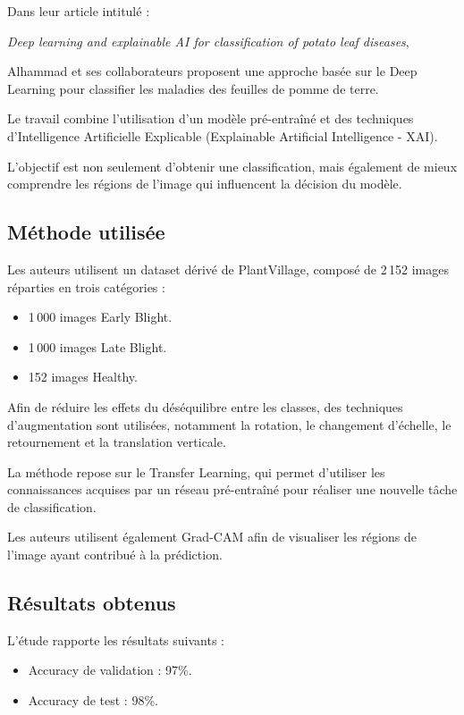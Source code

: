 \documentclass[12pt,a4paper,oneside]{report}
\begin{document}
Dans leur article intitulé :

\textit{Deep learning and explainable AI for classification
of potato leaf diseases},

Alhammad et ses collaborateurs proposent une approche
basée sur le Deep Learning pour classifier les maladies
des feuilles de pomme de terre.

Le travail combine l'utilisation d'un modèle pré-entraîné
et des techniques d'Intelligence Artificielle Explicable
(Explainable Artificial Intelligence - XAI).

L'objectif est non seulement d'obtenir une classification,
mais également de mieux comprendre les régions de l'image
qui influencent la décision du modèle.

\subsection{Méthode utilisée}

Les auteurs utilisent un dataset dérivé de PlantVillage,
composé de 2\,152 images réparties en trois catégories :

\begin{itemize}
    \item 1\,000 images Early Blight.
    \item 1\,000 images Late Blight.
    \item 152 images Healthy.
\end{itemize}

Afin de réduire les effets du déséquilibre entre les classes,
des techniques d'augmentation sont utilisées, notamment
la rotation, le changement d'échelle, le retournement
et la translation verticale.

La méthode repose sur le Transfer Learning, qui permet
d'utiliser les connaissances acquises par un réseau
pré-entraîné pour réaliser une nouvelle tâche de classification.

Les auteurs utilisent également Grad-CAM afin de visualiser
les régions de l'image ayant contribué à la prédiction.

\subsection{Résultats obtenus}

L'étude rapporte les résultats suivants :

\begin{itemize}
    \item Accuracy de validation : 97\%.
    \item Accuracy de test : 98\%.
\end{itemize}
\end{document}
